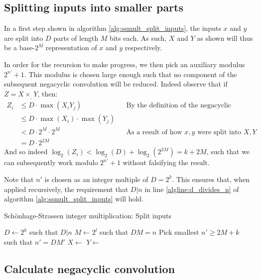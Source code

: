 \subsection{Splitting inputs into smaller parts}

In a first step shown in algorithm \ref{alg:ssmult_split_inputs}, the inputs
$x$ and $y$ are split into $D$ parts of length $M$ bits each. As such, $X$ and
$Y$ as shown will thus be a base-$2^M$ representation of $x$ and $y$
respectively.

In order for the recursion to make progress, we then pick an auxiliary modulus
$2^{n'} + 1$. This modulus is chosen large enough such that no component of the
subsequent negacyclic convolution will be reduced. Indeed observe that if $Z = X
\times_\_ Y$, then:
\begin{align*}
		Z_i & \leq D \cdot \max(X_i Y_j) && \text{By the definition of the negacyclic convolution} \\
			& \leq D \cdot \max(X_i) \cdot \max(Y_j) \\
			& < D \cdot 2^M \cdot 2^M && \text{As a result of how $x, y$ were split into $X, Y$} \\
			& = D \cdot 2^{2M}
\end{align*}
And so indeed $\log_2(Z_i) < \log_2(D) + \log_2(2^{2M}) = k + 2M$, such that we
can subsequently work modulo $2^{n'} + 1$ without falsifying the result.

Note that $n'$ is chosen as an integer multiple of $D = 2^k$. This ensures
that, when applied recursively, the requirement that $D | n$ in line
\ref{algline:d_divides_n} of algorithm \ref{alg:ssmult_split_inputs} will hold.

\begin{algorithm}
		\caption{Schönhage-Strassen integer multiplication: Split inputs}
		\begin{algorithmic}[1]
				\State $D \gets 2^k$ such that $D | n$
				\label{algline:d_divides_n}
				\State $M \gets 2^l$ such that $DM = n$
				\State Pick smallest $n' \geq 2M + k$ such that $n' = DM'$
				\State $X \gets $
				\State $Y \gets $
		\end{algorithmic}
		\label{alg:ssmult_split_inputs}
\end{algorithm}

\subsection{Calculate negacyclic convolution}

